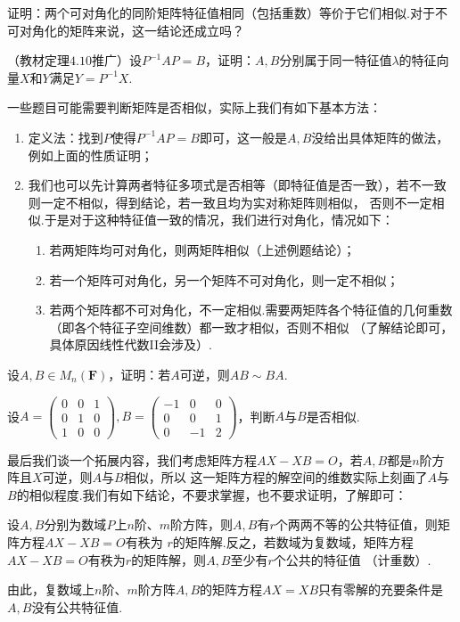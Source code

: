 \begin{example}
    证明：两个可对角化的同阶矩阵特征值相同（包括重数）等价于它们相似.对于不可对角化的矩阵来说，这一结论还成立吗？
\end{example}
\begin{example}
    （教材定理$4.10$推广）设$P^{-1}AP=B$，证明：$A,B$分别属于同一特征值$\lambda$的特征向量$X$和$Y$满足$Y=P^{-1}X$.
\end{example}
一些题目可能需要判断矩阵是否相似，实际上我们有如下基本方法：
\begin{enumerate}
    \item 定义法：找到$P$使得$P^{-1}AP=B$即可，这一般是$A,B$没给出具体矩阵的做法，例如上面的性质证明；
    \item 我们也可以先计算两者特征多项式是否相等（即特征值是否一致），若不一致则一定不相似，得到结论，若一致且均为实对称矩阵则相似，
    否则不一定相似.于是对于这种特征值一致的情况，我们进行对角化，情况如下：
    \begin{enumerate}[label=(\arabic*)]
        \item 若两矩阵均可对角化，则两矩阵相似（上述例题结论）；
        \item 若一个矩阵可对角化，另一个矩阵不可对角化，则一定不相似；
        \item 若两个矩阵都不可对角化，不一定相似.需要两矩阵各个特征值的几何重数（即各个特征子空间维数）都一致才相似，否则不相似
        （了解结论即可，具体原因线性代数II会涉及）.
    \end{enumerate}
\end{enumerate}
\begin{example}
    设$A,B\in M_n(\mathbf{F})$，证明：若$A$可逆，则$AB\sim BA$.
\end{example}
\begin{example}
    设$A=\begin{pmatrix}
        0 & 0 & 1 \\ 0 & 1 & 0 \\ 1 & 0 & 0
    \end{pmatrix},B=\begin{pmatrix}
        -1 & 0 & 0 \\ 0 & 0 & 1 \\ 0 & -1 & 2
    \end{pmatrix}$，判断$A$与$B$是否相似.
\end{example}
最后我们谈一个拓展内容，我们考虑矩阵方程$AX-XB=O$，若$A,B$都是$n$阶方阵且$X$可逆，则$A$与$B$相似，所以
这一矩阵方程的解空间的维数实际上刻画了$A$与$B$的相似程度.我们有如下结论，不要求掌握，也不要求证明，了解即可：
\begin{theorem}
    设$A,B$分别为数域$P$上$n$阶、$m$阶方阵，则$A,B$有$r$个两两不等的公共特征值，则矩阵方程$AX-XB=O$有秩为
    $r$的矩阵解.反之，若数域为复数域，矩阵方程$AX-XB=O$有秩为$r$的矩阵解，则$A,B$至少有$r$个公共的特征值
    （计重数）.
\end{theorem}
由此，复数域上$n$阶、$m$阶方阵$A,B$的矩阵方程$AX=XB$只有零解的充要条件是$A,B$没有公共特征值.

